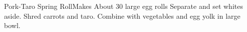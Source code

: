\documentclass[]{article}
\title{}
\author{}
\begin{document}
\begin{recipe}{Pork-Taro Spring Roll}{}{Makes About 30 large egg rolls}
	Separate and set whites aside. 
	Shred carrots and taro. 
	Combine with vegetables and egg yolk in large bowl. 
\end{recipe}
\end{document}
